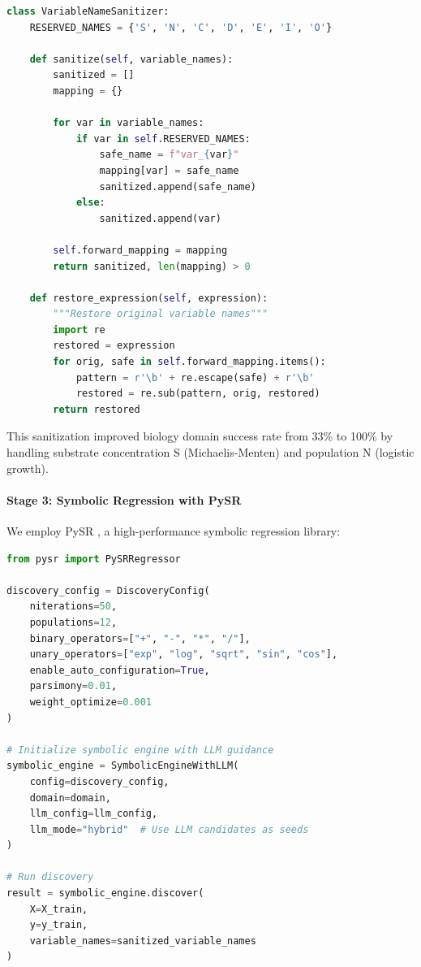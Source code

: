 \documentclass[twoside,11pt]{article}
\begin{document}
\begin{lstlisting}[language=Python, caption=Variable Name Sanitization]
class VariableNameSanitizer:
    RESERVED_NAMES = {'S', 'N', 'C', 'D', 'E', 'I', 'O'}

    def sanitize(self, variable_names):
        sanitized = []
        mapping = {}

        for var in variable_names:
            if var in self.RESERVED_NAMES:
                safe_name = f"var_{var}"
                mapping[var] = safe_name
                sanitized.append(safe_name)
            else:
                sanitized.append(var)

        self.forward_mapping = mapping
        return sanitized, len(mapping) > 0

    def restore_expression(self, expression):
        """Restore original variable names"""
        import re
        restored = expression
        for orig, safe in self.forward_mapping.items():
            pattern = r'\b' + re.escape(safe) + r'\b'
            restored = re.sub(pattern, orig, restored)
        return restored
\end{lstlisting}

This sanitization improved biology domain success rate from 33\% to 100\% by handling substrate concentration S (Michaelis-Menten) and population N (logistic growth).

\paragraph{Stage 3: Symbolic Regression with PySR}

We employ PySR \citep{cranmer2023pysr}, a high-performance symbolic regression library:

\begin{lstlisting}[language=Python, caption=Symbolic Regression Configuration]
from pysr import PySRRegressor

discovery_config = DiscoveryConfig(
    niterations=50,
    populations=12,
    binary_operators=["+", "-", "*", "/"],
    unary_operators=["exp", "log", "sqrt", "sin", "cos"],
    enable_auto_configuration=True,
    parsimony=0.01,
    weight_optimize=0.001
)

# Initialize symbolic engine with LLM guidance
symbolic_engine = SymbolicEngineWithLLM(
    config=discovery_config,
    domain=domain,
    llm_config=llm_config,
    llm_mode="hybrid"  # Use LLM candidates as seeds
)

# Run discovery
result = symbolic_engine.discover(
    X=X_train,
    y=y_train,
    variable_names=sanitized_variable_names
)
\end{lstlisting}
\end{document}
